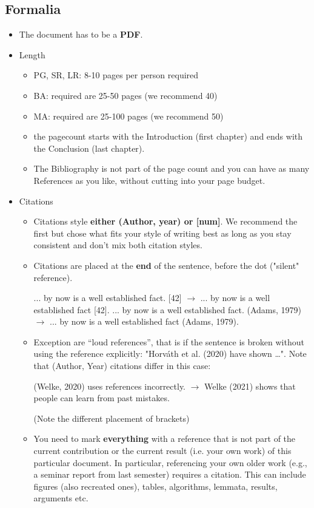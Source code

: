 \documentclass[twocolumn]{mlai-guide}
\newcommand{\cmark}{\textcolor[rgb]{0,0.9,0}{\ding{52}}}%
\newcommand{\xmark}{\textcolor[rgb]{0.9,0,0}{\ding{56}}}%
\newcommand{\eg}[2]{ \xmark #1 $\rightarrow$ \cmark #2}
\begin{document}
\subsection{Formalia}
\begin{itemize}

	\item The document has to be a \textbf{PDF}.

	\item Length
	\begin{itemize}
		\item PG, SR, LR: 8-10 pages per person required
		\item BA: required are 25-50 pages (we recommend 40)
		\item MA: required are 25-100 pages (we recommend 50)
		\item the pagecount starts with the Introduction (first chapter) and ends with the Conclusion (last chapter). 
		\item The Bibliography is not part of the page count and you can have as many References as you like, without cutting into your page budget. 
	\end{itemize}

	\item Citations
	\begin{itemize}
		\item Citations style \textbf{either (Author, year) or [num]}. We recommend the first but chose what fits your style of writing best as long as you stay consistent and don't mix both citation styles.
		\item Citations are placed at the \textbf{end} of the sentence, before the dot ("silent" reference). 

		\eg{... by now is a well established fact. [42]}{... by now is a well established fact [42].}
		\eg{... by now is a well established fact. (Adams, 1979)}{... by now is a well established fact (Adams, 1979).}
		\item Exception are ``loud references'', that is if the sentence is broken without using the reference explicitly: "Horv\'ath et al. (2020) have shown \dots".
		Note that (Author, Year) citations differ in this case:

		\eg{(Welke, 2020) uses references incorrectly.}{Welke (2021) shows that people can learn from past mistakes}. 

		(Note the different placement of brackets)
		\item You need to mark \textbf{everything} with a reference that is not part of the current contribution or the current result (i.e. your own work) of this particular document. In particular, referencing your own older work (e.g., a seminar report from last semester) requires a citation. This can include figures (also recreated ones), tables, algorithms, lemmata, results, arguments etc.
	\end{itemize}


\end{itemize}
\end{document}
